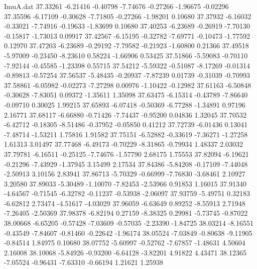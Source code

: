 \begin{filecontents}{ImuA.dat}
  37.33261   -6.21416   -0.40798   -7.74676   -0.27266   -1.96675   -0.02296
  37.35596   -6.17109   -0.30628   -7.71805   -0.27266   -1.98201    0.10680
  37.37932   -6.16032   -0.33021   -7.74916   -0.19633   -1.83699    0.10680
  37.40253   -6.23689   -0.26919   -7.70130   -0.15817   -1.73013    0.09917
  37.42567   -6.15195   -0.32782   -7.69771   -0.10473   -1.77592    0.12970
  37.47203   -6.23689   -0.29192   -7.79582   -0.21923   -1.60800    0.21366
  37.49518   -5.97009   -0.23450   -8.23610    0.58224   -1.66906    0.53425
  37.51866   -5.59083   -0.70110   -7.92144   -0.45585   -1.23398    0.55715
  37.54212   -5.59322   -0.51087   -8.17269   -0.01314   -0.89813   -0.57254
  37.56537   -5.48435   -0.20937   -7.87239    0.01739   -0.31039   -0.70993
  37.58861   -6.05982   -0.02273   -7.27298    0.00976   -1.10422   -0.12982
  37.61163   -6.50848   -0.30628   -7.83051    0.09372   -1.35611    1.35098
  37.63475   -6.15314   -0.43789   -7.86640   -0.09710    0.30025    1.99215
  37.65893   -6.07418   -0.50369   -6.77288   -1.34891    0.97196    2.16771
  37.68117   -6.66880   -0.71426   -7.74437   -0.95200    0.04836    1.32045
  37.70532   -6.42712   -0.18305   -8.51486   -0.37952   -0.05850    0.41212
  37.72739   -6.01436    0.13041   -7.48714   -1.53211    1.75816    1.91582
  37.75151   -6.52882   -0.33619   -7.36271   -1.27258    1.61313    3.01497
  37.77468   -6.49173   -0.70229   -8.31865   -0.79934    1.48337    2.03032
  37.79781   -6.16511   -0.25125   -7.74676   -1.57790    2.68175    1.75553
  37.82094   -6.19621   -0.21296   -7.43929   -1.37945    3.15499    2.17534
  37.84386   -5.84208   -0.17109   -7.44048   -2.50913    3.10156    2.83941
  37.86713   -5.70329   -0.66999   -7.76830   -3.68461    2.10927    3.20580
  37.89033   -5.30489   -1.10070   -7.82453   -2.53966    0.91853    1.16015
  37.91340   -4.64567   -0.71545   -6.32782   -0.11237   -0.53938   -2.06097
  37.93759   -5.49751    0.32183   -6.62812    2.73474   -4.51617   -4.03029
  37.96059   -6.63649    0.89252   -8.55913    2.71948   -7.26405   -2.50369
  37.98378   -6.82194    0.27159   -8.38325    0.29981   -5.73745   -0.87022
  38.00668   -6.65205   -0.57428   -7.03609   -0.57035   -2.23390   -1.84725
  38.03214   -8.16551   -0.43549   -7.84607   -0.81460   -0.22642   -1.96174
  38.05524   -7.03849   -0.80638   -9.11905   -0.84514    1.84975    0.10680
  38.07752   -5.60997   -0.52762   -7.67857   -1.48631    4.50604    2.16008
  38.10068   -5.84926   -0.93200   -6.64128   -3.82201    4.91822    4.43471
  38.12365   -7.05524   -0.96431   -7.63310   -0.66194    1.21621    1.25938

\end{filecontents}
